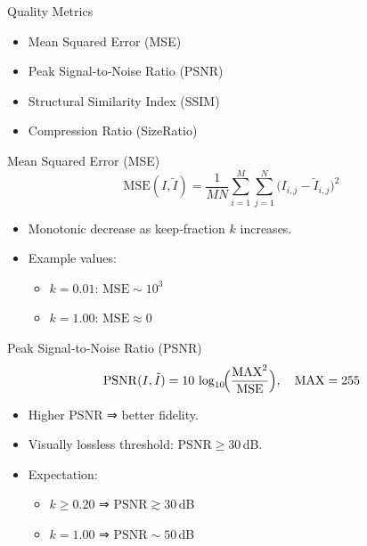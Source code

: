 \documentclass[12pt]{beamer}
\begin{document}
\begin{frame}{Quality Metrics}
  \begin{itemize}
    \item Mean Squared Error (MSE)
    \item Peak Signal‑to‑Noise Ratio (PSNR)
    \item Structural Similarity Index (SSIM)
    \item Compression Ratio (SizeRatio)
  \end{itemize}
\end{frame}

\begin{frame}{Mean Squared Error (MSE)}
  \[
    \mathrm{MSE}(I,\tilde I)
    = \frac{1}{MN} \sum_{i=1}^M \sum_{j=1}^N \bigl(I_{i,j} - \tilde I_{i,j}\bigr)^2
  \]
  \vspace{1em}
  \begin{itemize}
    \item Monotonic decrease as keep‑fraction \(k\) increases.
    \item Example values:
      \begin{itemize}
        \item \(k=0.01\): \(\mathrm{MSE}\sim10^3\)
        \item \(k=1.00\): \(\mathrm{MSE}\approx0\)
      \end{itemize}
  \end{itemize}
\end{frame}

\begin{frame}{Peak Signal‑to‑Noise Ratio (PSNR)}
  \[
    \mathrm{PSNR}(I,\tilde I)
    = 10 \,\log_{10}\!\Bigl(\frac{\mathrm{MAX}^2}{\mathrm{MSE}}\Bigr),
    \quad \mathrm{MAX}=255
  \]
  \vspace{1em}
  \begin{itemize}
    \item Higher PSNR ⇒ better fidelity.
    \item Visually lossless threshold: \(\mathrm{PSNR}\ge30\)\,dB.
    \item Expectation:
      \begin{itemize}
        \item \(k\ge0.20\) ⇒ \(\mathrm{PSNR}\gtrsim30\)\,dB
        \item \(k=1.00\) ⇒ \(\mathrm{PSNR}\sim50\)\,dB
      \end{itemize}
  \end{itemize}
\end{frame}
\end{document}
